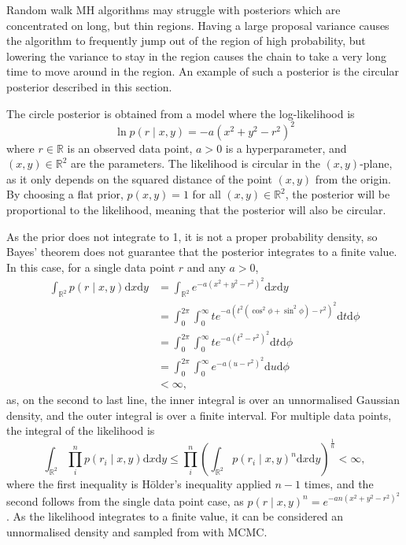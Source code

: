 \documentclass[english,twoside,openright]{HYgraduMLDS}
\newcommand{\R}{\mathbb{R}}
\newcommand{\dx}{\mathrm{d}}
\begin{document}
Random walk MH algorithms may struggle with posteriors which are concentrated
on long, but thin regions. Having a large proposal variance causes the algorithm
to frequently jump out of the region of high probability, but lowering the
variance to stay in the region causes the chain to take a very long time to move
around in the region. An example of such a posterior is the circular posterior
described in this section.

The circle posterior is obtained from a model where the log-likelihood is
\[
    \ln p(r\mid x, y) = -a(x^2 + y^2 - r^2)^2
\]
where \(r\in \R\) is an observed data point, \(a > 0\) is a hyperparameter,
and \((x, y)\in \R^{2}\) are the parameters.
The likelihood is circular in the \((x, y)\)-plane, as it only depends on the
squared distance of the point \((x, y)\) from the origin. By choosing a flat
prior, \(p(x, y) = 1\) for all \((x, y)\in \R^{2}\), the posterior will be
proportional to the likelihood, meaning that the posterior will also be circular.

As the prior does not integrate to 1, it is not a proper probability density,
so Bayes' theorem does not guarantee that the posterior integrates to a finite
value. In this case, for a single data point \(r\) and any \(a > 0\),
\begin{align*}
  \int_{\R^{2}}p(r\mid x, y)\dx x\dx y
  &= \int_{\R^{2}}e^{-a(x^{2} + y^{2} - r^{2})^{2}}\dx x\dx y
  \\&= \int_{0}^{2\pi}\int_{0}^{\infty}
  te^{-a(t^{2}(\cos^{2} \phi + \sin^{2} \phi) - r^{2})^{2}} \dx t\dx \phi
  \\&= \int_{0}^{2\pi} \int_{0}^{\infty} te^{-a(t^{2} - r^{2})^{2}}\dx t\dx \phi
  \\&= \int_{0}^{2\pi} \int_{0}^{\infty} e^{-a(u - r^{2})^{2}}\dx u\dx \phi
  \\&< \infty,
\end{align*}
as, on the second to last line, the inner integral is over an unnormalised
Gaussian density, and
the outer integral is over a finite interval. For multiple data points, the
integral of the likelihood is
\[
  \int_{\R^{2}}\prod_{i}^{n}p(r_{i}\mid x,y)\dx x\dx y
  \leq \prod_{i}^{n}\left(\int_{\R^{2}}p(r_{i}\mid x,y)^{n}\dx x\dx y\right)^{\frac{1}{n}}
  < \infty,
\]
where the first inequality is Hölder's inequality applied \(n - 1\) times,
and the second follows from the single data point case, as
\(p(r\mid x,y)^{n} = e^{-an(x^{2} + y^{2} - r^{2})^{2}}\).
As the likelihood integrates to a
finite value, it can be considered an unnormalised density and sampled from
with MCMC.
\end{document}
